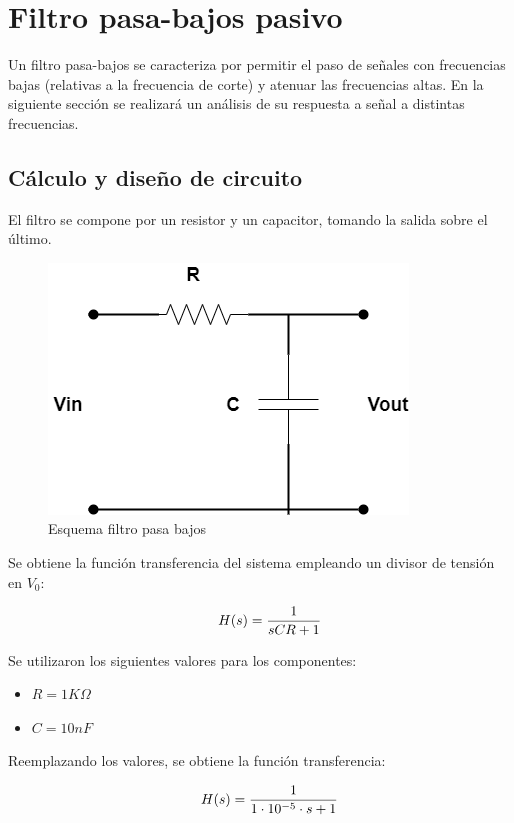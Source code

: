 \section{Filtro pasa-bajos pasivo}

Un filtro pasa-bajos se caracteriza por permitir el paso de señales con frecuencias bajas (relativas a la frecuencia de corte) y atenuar las frecuencias altas. En la siguiente sección se realizará un análisis de su respuesta a señal a distintas frecuencias. 

\subsection{Cálculo y diseño de circuito}

El filtro se compone por un resistor y un capacitor, tomando la salida sobre el último. 

\begin{figure}[H]
	\centering
	\includegraphics[scale=0.6]{../Informe/Imagenes/RC.png}
	\caption{Esquema filtro pasa bajos}
	\label{ej1cir}
\end{figure}

Se obtiene la función transferencia del sistema empleando un divisor de tensión en $V_0$:

$$\hspace{0.5cm} H(s) = \frac{1}{sCR + 1} $$

Se utilizaron los siguientes valores para los componentes:

\begin{itemize}[leftmargin=2cm]
	\item $R = 1K\Omega$
	\item $C = 10nF$
  \end{itemize}

Reemplazando los valores, se obtiene la función transferencia:

$$\hspace{0.5cm} H(s) = \frac{1}{1\cdot 10^{-5}\cdot s + 1} $$

